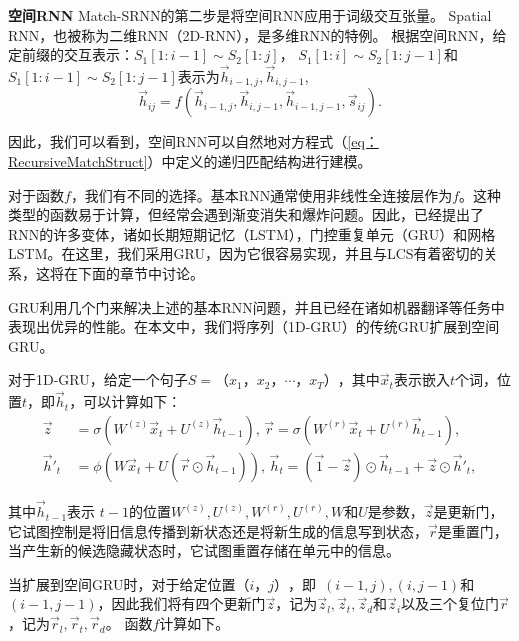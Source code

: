\textbf{空间RNN}
Match-SRNN的第二步是将空间RNN应用于词级交互张量。 Spatial RNN，也被称为二维RNN（2D-RNN），是多维RNN的特例。 根据空间RNN，给定前缀的交互表示：$S_1[1{:}i{-}1]\!{\sim}\! S_2[1{:}j]$， $S_1[1{:}i]\!{\sim}\! S_2[1{:}j{-}1]$和$S_1[1{:}i{-}1]\!{\sim}\! S_2[1{:}j{-}1]$表示为$\vec{h}_{i-1,j},\vec{h}_{i,j-1}$, 
\begin{equation}
\vec{h}_{ij}=f(\vec{h}_{i-1,j},\vec{h}_{i,j-1},\vec{h}_{i-1,j-1},\vec{s}_{ij}).
\end{equation}

因此，我们可以看到，空间RNN可以自然地对方程式（\ref {eq：RecursiveMatchStruct}）中定义的递归匹配结构进行建模。

对于函数$ f $，我们有不同的选择。基本RNN通常使用非线性全连接层作为$ f $。这种类型的函数易于计算，但经常会遇到渐变消失和爆炸问题。因此，已经提出了RNN的许多变体，诸如长期短期记忆（LSTM），门控重复单元（GRU）和网格LSTM。在这里，我们采用GRU，因为它很容易实现，并且与LCS有着密切的关系，这将在下面的章节中讨论。

GRU利用几个门来解决上述的基本RNN问题，并且已经在诸如机器翻译等任务中表现出优异的性能。在本文中，我们将序列（1D-GRU）的传统GRU扩展到空间GRU。

对于1D-GRU，给定一个句子$ S {=}（x_1，x_2，\cdots，x_T）$，其中$ \vec {x}_t $表示嵌入$ t $个词，位置$ t $，即$ \vec {h} _t $，可以计算如下：
\begin{equation*}
	\begin{aligned}
		\vec{z} \,& {=} \sigma(W^{(z)}\vec{x}_t + U^{(z)}\vec{h}_{t-1}),\,\vec{r}{=} \sigma(W^{(r)}\vec{x}_t + U^{(r)}\vec{h}_{t-1}), \\
		\vec{h}'_t \,&{=} \phi(W\vec{x}_t{+}U(\vec{r}\odot \vec{h}_{t-1})),\,\vec{h}_t{=} (\vec{1}-\vec{z})\odot \vec{h}_{t-1} {+} \vec{z} \odot \vec{h}'_t,
	\end{aligned}
\end{equation*}

其中$ \vec {h} _ {t-1} $表示 $t{-}1$的位置$W^{(z)},U^{(z)},W^{(r)},U^{(r)},W$和$ U $是参数，$ \vec {z} $是更新门，它试图控制是将旧信息传播到新状态还是将新生成的信息写到状态，$ \vec {r} $是重置门，当产生新的候选隐藏状态时，它试图重置存储在单元中的信息。

当扩展到空间GRU时，对于给定位置$（i，j）$，即~$(i { - } 1,j), (i, j { - } 1)$和$ (i { - } 1, j { - } 1)$，因此我们将有四个更新门$ \vec{z} $，记为$ \vec{z} _ {l}, \vec {z} _t , \vec {z} _d $和$ \vec {z} _i $以及三个复位门$ \vec {r} $，记为$\vec{r}_l, \vec{r}_t, \vec{r}_d$。 函数$ f $计算如下。


